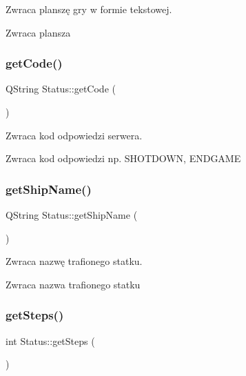 Zwraca planszę gry w formie tekstowej. 

\begin{DoxyReturn}{Zwraca}
plansza 
\end{DoxyReturn}
\mbox{\label{classStatus_aece70dc1503772d16d5531b405d46c4c}} 
\subsubsection{\texorpdfstring{getCode()}{getCode()}}
{\footnotesize\ttfamily Q\+String Status\+::get\+Code (\begin{DoxyParamCaption}{ }\end{DoxyParamCaption})}



Zwraca kod odpowiedzi serwera. 

\begin{DoxyReturn}{Zwraca}
kod odpowiedzi np. S\+H\+O\+T\+D\+O\+WN, E\+N\+D\+G\+A\+ME 
\end{DoxyReturn}
\mbox{\label{classStatus_a5f17aa5a599b9ba39c5d849f0132765f}} 
\subsubsection{\texorpdfstring{getShipName()}{getShipName()}}
{\footnotesize\ttfamily Q\+String Status\+::get\+Ship\+Name (\begin{DoxyParamCaption}{ }\end{DoxyParamCaption})}



Zwraca nazwę trafionego statku. 

\begin{DoxyReturn}{Zwraca}
nazwa trafionego statku 
\end{DoxyReturn}
\mbox{\label{classStatus_af5e06b8a1eff42c1720c8a06b4bb5c11}} 
\subsubsection{\texorpdfstring{getSteps()}{getSteps()}}
{\footnotesize\ttfamily int Status\+::get\+Steps (\begin{DoxyParamCaption}{ }\end{DoxyParamCaption})}



